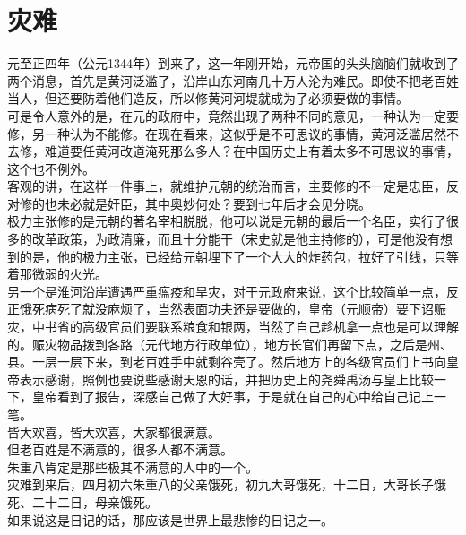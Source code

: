 \section{灾难}
\ifnum{}
	\begin{multicols}{\theparacolNo}
\fi
元至正四年（公元1344年）到来了，这一年刚开始，元帝国的头头脑脑们就收到了两个消息，首先是黄河泛滥了，沿岸山东河南几十万人沦为难民。即使不把老百姓当人，但还要防着他们造反，所以修黄河河堤就成为了必须要做的事情。\\

可是令人意外的是，在元的政府中，竟然出现了两种不同的意见，一种认为一定要修，另一种认为不能修。在现在看来，这似乎是不可思议的事情，黄河泛滥居然不去修，难道要任黄河改道淹死那么多人？在中国历史上有着太多不可思议的事情，这个也不例外。\\

客观的讲，在这样一件事上，就维护元朝的统治而言，主要修的不一定是忠臣，反对修的也未必就是奸臣，其中奥妙何处？要到七年后才会见分晓。\\

极力主张修的是元朝的著名宰相脱脱，他可以说是元朝的最后一个名臣，实行了很多的改革政策，为政清廉，而且十分能干（宋史就是他主持修的），可是他没有想到的是，他的极力主张，已经给元朝埋下了一个大大的炸药包，拉好了引线，只等着那微弱的火光。\\

另一个是淮河沿岸遭遇严重瘟疫和旱灾，对于元政府来说，这个比较简单一点，反正饿死病死了就没麻烦了，当然表面功夫还是要做的，皇帝（元顺帝）要下诏赈灾，中书省的高级官员们要联系粮食和银两，当然了自己趁机拿一点也是可以理解的。赈灾物品拨到各路（元代地方行政单位），地方长官们再留下点，之后是州、县。一层一层下来，到老百姓手中就剩谷壳了。然后地方上的各级官员们上书向皇帝表示感谢，照例也要说些感谢天恩的话，并把历史上的尧舜禹汤与皇上比较一下，皇帝看到了报告，深感自己做了大好事，于是就在自己的心中给自己记上一笔。\\

皆大欢喜，皆大欢喜，大家都很满意。\\

但老百姓是不满意的，很多人都不满意。\\

朱重八肯定是那些极其不满意的人中的一个。\\

灾难到来后，四月初六朱重八的父亲饿死，初九大哥饿死，十二日，大哥长子饿死、二十二日，母亲饿死。\\

如果说这是日记的话，那应该是世界上最悲惨的日记之一。\\


\end{multicols}
